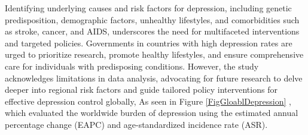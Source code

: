 Identifying underlying causes and risk factors for depression, including genetic predisposition, demographic factors, unhealthy lifestyles, and comorbidities such as stroke, cancer, and AIDS, underscores the need for multifaceted interventions and targeted policies. Governments in countries with high depression rates are urged to prioritize research, promote healthy lifestyles, and ensure comprehensive care for individuals with predisposing conditions. However, the study acknowledges limitations in data analysis, advocating for future research to delve deeper into regional risk factors and guide tailored policy interventions for effective depression control globally, As seen in Figure \ref{FigGloablDepression} \cite{liu2020changes}, which evaluated the worldwide burden of depression using the estimated annual percentage change (EAPC) and age-standardized incidence rate (ASR).

